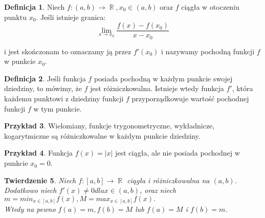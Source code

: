 \documentclass[12pt,a4paper]{article}
\newtheorem{tw}{Twierdzenie}[section]
\theoremstyle{definition}
\newtheorem{df}[tw]{Definicja}
\newtheorem{ex}[tw]{Przykład}
\DeclareMathOperator{\R}{\mathbb{R}}
\begin{document}
	\begin{df}
		Niech $f:(a,b) \rightarrow \R, x_0 \in (a,b)$ oraz $f$ ciągła w otoczeniu punktu $x_0$. Jeśli istnieje granica:\\
		\begin{displaymath}
			\lim_{x \to x_0} \frac{f(x)-f(x_0)}{x-x_0}
		\end{displaymath}

i jest skończonam to oznaczamy ją przez $f'(x_0)$ i nazywamy pochodną funkcji $f$ w punkcie $x_0$.
	\end{df}
	\begin{df}
		Jeśli funkcja $f$ posiada pochodną w każdym punkcie swojej dziedziny, to mówimy, że $f$ jest różniczkowalna. Istnieje wtedy funkcja $f'$, która każdemu punktowi z dziedziny funkcji $f$ przyporządkowuje wartość pochodnej funkcji $f$ w tym punkcie.
	\end{df}
	\begin{ex}
		Wielomiany, funkcje trygonometryczne, wykładnicze, kogarytmiczne są różniczkowalne w każdym punkcie dziedziny.
	\end{ex}
	\begin{ex}
		Funkcja $f(x)=|x|$ jest ciągła, ale nie posiada pochodnej w punkcie $x_0=0$.	
	\end{ex}
	\begin{tw}
		Niech $f: [a,b] \rightarrow \R$ ciągła i różniczkowalna na $(a,b)$. Dodatkowo niech $f'(x) \neq 0 dla x\in (a,b)$, oraz niech $m=min_{x\in [a,b]} f(x), M=max_{x \in [a,b]}f(x).$\\
Wtedy na pewno $f(a)=m, f(b)=M$ lub $f(a)=M$ i $f(b)=m$.
	\end{tw}
\end{document}

